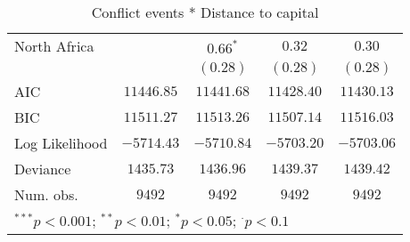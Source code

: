 \begin{sidewaystable}
\begin{center}
{\begin{tabular}{l c c c c}
North Africa                             &               & $0.66^{*}$    & $0.32$        & $0.30$        \\
                                         &               & $(0.28)$      & $(0.28)$      & $(0.28)$      \\
\midrule
AIC                                      & $11446.85$    & $11441.68$    & $11428.40$    & $11430.13$    \\
BIC                                      & $11511.27$    & $11513.26$    & $11507.14$    & $11516.03$    \\
Log Likelihood                           & $-5714.43$    & $-5710.84$    & $-5703.20$    & $-5703.06$    \\
Deviance                                 & $1435.73$     & $1436.96$     & $1439.37$     & $1439.42$     \\
Num. obs.                                & $9492$        & $9492$        & $9492$        & $9492$        \\
\bottomrule
\multicolumn{5}{l}{\scriptsize{$^{***}p<0.001$; $^{**}p<0.01$; $^{*}p<0.05$; $^{\cdot}p<0.1$}}
\end{tabular}
}
\caption{Conflict events *
		  Distance to capital}
\label{newinteraction_both}
\end{center}
\end{sidewaystable}
